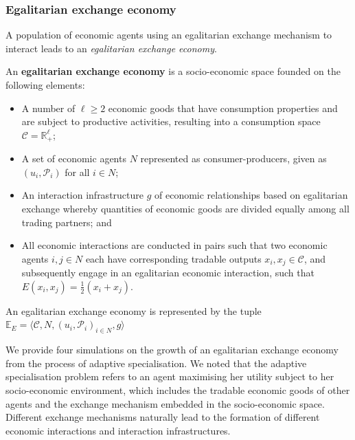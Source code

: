 \subsubsection{Egalitarian exchange economy}

A population of economic agents using an egalitarian exchange mechanism to interact leads to an \emph{egalitarian exchange economy}.

\begin{definition}
An \textbf{egalitarian exchange economy} is a socio-economic space founded on the following elements:
\begin{itemize}
	\item A number of $\ell \geqslant 2$ economic goods that have consumption properties and are subject to productive activities, resulting into a consumption space $\mathcal{C} = \mathbb{R}^{\ell}_{+}$;

	\item A set of economic agents $N$ represented as consumer-producers, given as $\left( u_{i}, \mathcal{P}_{i} \right)$ for all $i \in N$;

	\item An interaction infrastructure $g$ of economic relationships based on egalitarian exchange whereby quantities of economic goods are divided equally among all trading partners; and

	\item All economic interactions are conducted in pairs such that two economic agents $i,j \in N$ each have corresponding tradable outputs $x_{i}, x_{j} \in \mathcal{C}$, and subsequently engage in an egalitarian economic interaction, such that $E(x_{i}, x_{j}) = \frac{1}{2} \left( x_{i} + x_{j} \right)$.
\end{itemize}
An egalitarian exchange economy is represented by the tuple $\mathbb{E}_{E} = \big \langle \mathcal{C}, N, (u_{i}, \mathcal{P}_{i})_{i \in N}, g \big \rangle$
\end{definition}

We provide four simulations on the growth of an egalitarian exchange economy from the process of adaptive specialisation. We noted that the adaptive specialisation problem refers to an agent maximising her utility subject to her socio-economic environment, which includes the tradable economic goods of other agents and the exchange mechanism embedded in the socio-economic space. Different exchange mechanisms naturally lead to the formation of different economic interactions and interaction infrastructures.

